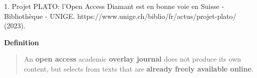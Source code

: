 \documentclass[10pt,compress,serif,aspectratio=169]{beamer}
\begin{document}

\begin{frame}[t]%
 \vskip1cm%


 1. Projet PLATO: l’Open Access Diamant est en bonne voie en Suisse - Bibliothèque - UNIGE. https://www.unige.ch/biblio/fr/actus/projet-plato/ (2023).
\end{frame}


\begin{frame}[t]%
 \vskip1cm%

 \textbf{Definition}\newline\newline
 \begin{quote}
   An \textbf{open access} academic \textbf{overlay journal} does not produce its own content, but selects from texts that are \textbf{already freely available online}.
 \end{quote}

 
\end{frame}
 
\end{document}
